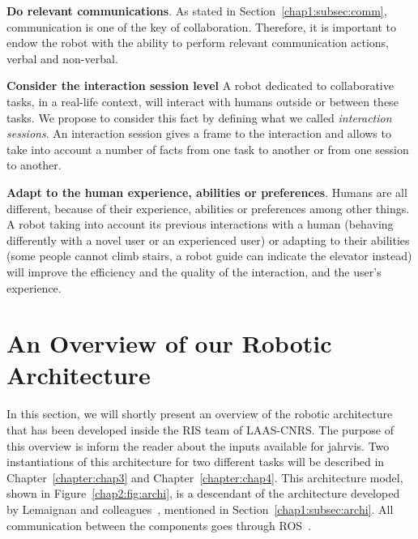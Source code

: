 \documentclass[a4paper,11pt,twoside]{StyleThese}
\begin{document}
\begin{bulletList}
	\item \textbf{Do relevant communications}. As stated in Section~\ref{chap1:subsec:comm}, communication is one of the key of collaboration. Therefore, it is important to endow the robot with the ability to perform relevant communication actions, verbal and non-verbal.
	\item \textbf{Consider the interaction session level} A robot dedicated to collaborative tasks, in a real-life context, will interact with humans outside or between these tasks. We propose to consider this fact by defining what we called \textit{interaction sessions}. An interaction session gives a frame to the interaction and allows to take into account a number of facts from one task to another or from one session to another.
	\item \textbf{Adapt to the human experience, abilities or preferences}. Humans are all different, because of their experience, abilities or preferences among other things. A robot taking into account its previous interactions with a human (\eg behaving differently with a novel user or an experienced user) or adapting to their abilities (\eg some people cannot climb stairs, a robot guide can indicate the elevator instead) will improve the efficiency and the quality of the interaction, and the user's experience.
\end{bulletList}


\section{An Overview of our Robotic Architecture}\label{chap2:sec:rob_archi}

In this section, we will shortly present an overview of the robotic architecture that has been developed inside the RIS team of LAAS-CNRS. The purpose of this overview is inform the reader about the inputs available for \acrshort{jahrvis}. Two instantiations of this architecture for two different tasks will be described in Chapter~\ref{chapter:chap3} and Chapter~\ref{chapter:chap4}. This architecture model, shown in Figure~\ref{chap2:fig:archi}, is a descendant of the architecture developed by Lemaignan and colleagues~\cite{lemaignan_2017_artificial}, mentioned in Section~\ref{chap1:subsec:archi}. All communication between the components goes through ROS~\cite{quigley_2009_ros}.
\end{document}
